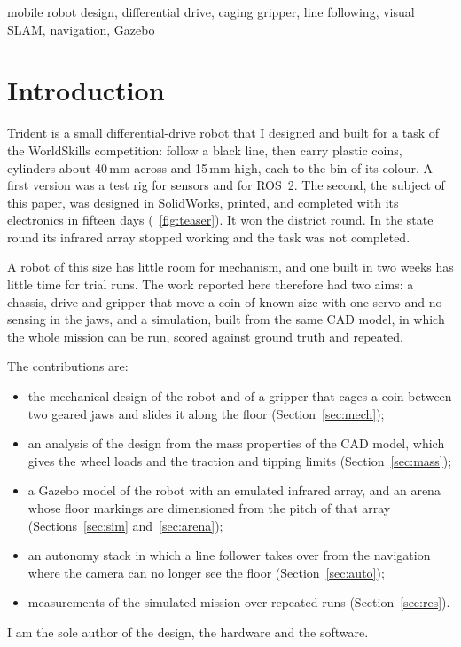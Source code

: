 \documentclass[conference,a4paper]{IEEEtran}
\newcommand{\unit}[1]{\ensuremath{\,\mathrm{#1}}}
\begin{document}
\begin{IEEEkeywords}
mobile robot design, differential drive, caging gripper, line following, visual SLAM,
navigation, Gazebo
\end{IEEEkeywords}

\section{Introduction}
Trident is a small differential-drive robot that I designed and built for a task of the
WorldSkills competition: follow a black line, then carry plastic coins, cylinders about
40\unit{mm} across and 15\unit{mm} high, each to the bin of its colour. A first version was
a test rig for sensors and for ROS~2. The second, the subject of this paper, was designed in
SolidWorks, printed, and completed with its electronics in fifteen days
(\figurename~\ref{fig:teaser}). It won the district round. In the state round its infrared
array stopped working and the task was not completed.

A robot of this size has little room for mechanism, and one built in two weeks has little
time for trial runs. The work reported here therefore had two aims: a chassis, drive and
gripper that move a coin of known size with one servo and no sensing in the jaws, and a
simulation, built from the same CAD model, in which the whole mission can be run, scored
against ground truth and repeated.

The contributions are:
\begin{itemize}
  \item the mechanical design of the robot and of a gripper that cages a coin between two
        geared jaws and slides it along the floor (Section~\ref{sec:mech});
  \item an analysis of the design from the mass properties of the CAD model, which gives
        the wheel loads and the traction and tipping limits (Section~\ref{sec:mass});
  \item a Gazebo model of the robot with an emulated infrared array, and an arena whose
        floor markings are dimensioned from the pitch of that array
        (Sections~\ref{sec:sim} and~\ref{sec:arena});
  \item an autonomy stack in which a line follower takes over from the navigation where the
        camera can no longer see the floor (Section~\ref{sec:auto});
  \item measurements of the simulated mission over repeated runs
        (Section~\ref{sec:res}).
\end{itemize}
I am the sole author of the design, the hardware and the software.
\end{document}
